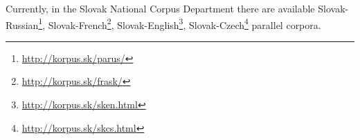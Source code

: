 Currently, in the Slovak National Corpus Department there are available
Slovak-Russian\footnote{\url{http://korpus.sk/parus/}},
Slovak-French\footnote{\url{http://korpus.sk/frask/}},
Slovak-English\footnote{\url{http://korpus.sk/sken.html}},
Slovak-Czech\footnote{\url{http://korpus.sk/skcs.html}} parallel
corpora.
